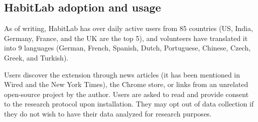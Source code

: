 \subsection{HabitLab adoption and usage}

As of writing, HabitLab has over  daily active users from 85 countries (US, India, Germany, France, and the UK are the top 5), and volunteers have translated it into 9 languages (German, French, Spanish, Dutch, Portuguese, Chinese, Czech, Greek, and Turkish).

Users discover the extension through news articles (it has been mentioned in Wired and the New York Times), the Chrome store, or links from an unrelated open-source project by the author. Users are asked to read and provide consent to the research protocol upon installation. They may opt out of data collection if they do not wish to have their data analyzed for research purposes.



